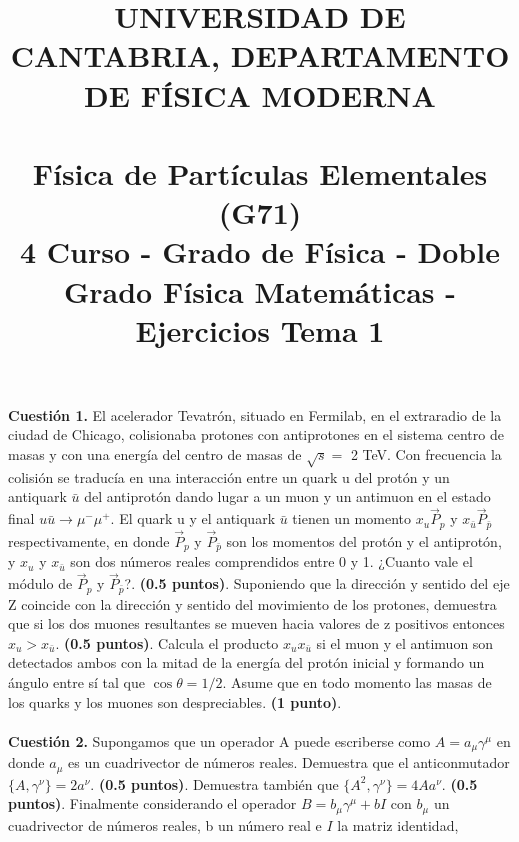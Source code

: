 \documentclass[paper=a4, fontsize=11pt]{scrartcl} %
\date{}
\title{	
\normalfont \normalsize 
\textsc{UNIVERSIDAD DE CANTABRIA, DEPARTAMENTO DE FÍSICA MODERNA} \\ [20pt] %
\horrule{0.5pt} \\[0.4cm] %
\huge Física de Partículas Elementales (G71) \\ %
\normalsize 4 Curso - Grado de Física - Doble Grado Física Matemáticas - Ejercicios Tema 1
\horrule{2pt} \\[0.5cm] %
}
\numberwithin{equation}{section} %
\numberwithin{figure}{section} %
\numberwithin{table}{section} %
\begin{document}
\maketitle %

\vspace{-2.5cm}

\textbf{Cuestión 1.} El acelerador Tevatrón, situado en Fermilab, en el extraradio de la ciudad de Chicago, colisionaba protones
con antiprotones en el sistema centro de masas y con una energía del centro de masas de $\sqrt{s}=$ 2 TeV. Con frecuencia la colisión
se traducía en una interacción entre un quark u del protón y un antiquark $\bar{u}$ del antiprotón dando lugar a un muon y un antimuon en 
el estado final $u\bar{u}\rightarrow\mu^{-}\mu^{+}$. El quark u y el antiquark $\bar{u}$ tienen un momento $x_u\vec{P}_p$ y $x_{\bar{u}}\vec{P}_{\bar{p}}$
respectivamente, en donde $\vec{P}_p$ y $\vec{P}_{\bar{p}}$ son los momentos del protón y el antiprotón, y $x_u$ y $x_{\bar{u}}$ son dos números reales
comprendidos entre 0 y 1. ¿Cuanto vale el módulo de $\vec{P}_p$ y $\vec{P}_{\bar{p}}$?. \textbf{(0.5 puntos)}. Suponiendo que la dirección y sentido
del eje Z coincide con la dirección y sentido del movimiento de los protones, demuestra que si los dos muones resultantes se mueven hacia valores de z
positivos entonces $x_u>x_{\bar{u}}$. \textbf{(0.5 puntos)}. Calcula el producto $x_ux_{\bar{u}}$ si el muon y el antimuon son detectados ambos
con la mitad de la energía del protón inicial y formando un ángulo entre sí tal que $\cos{\theta}=1/2$. Asume que en todo momento las masas de los quarks
y los muones son despreciables. \textbf{(1 punto)}.
\\
\\
\textbf{Cuestión 2.} Supongamos que un operador A puede escriberse como $A=a_\mu\gamma^\mu$ en donde $a_\mu$ es un cuadrivector de números reales. 
Demuestra que el anticonmutador $\{A, \gamma^\nu\}=2a^{\nu}$. \textbf{(0.5 puntos)}. Demuestra también que $\{A^2, \gamma^\nu\}=4Aa^\nu$. \textbf{(0.5 puntos)}.
Finalmente considerando el operador $B=b_\mu\gamma^\mu+bI$ con $b_\mu$ un cuadrivector de números reales, b un número real e $I$ la matriz identidad,
\end{document}
